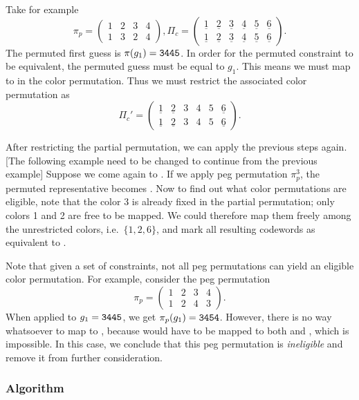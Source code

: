 Take for example 
\[
\pi_p = 
\begin{pmatrix}
1 & 2 & 3 & 4 \\
1 & 3 & 2 & 4
\end{pmatrix} , 
\Pi_c = 
\begin{pmatrix}
\underline{1} & \underline{2} & \underline{3} & \underline{4} & \underline{5} & \underline{6} \\
\underline{1} & \underline{2} & \underline{3} & \underline{4} & \underline{5} & \underline{6} 
\end{pmatrix} .
\] 
The permuted first guess is $\pi(g_1) = \texttt{3445}$. In order for the permuted constraint to be equivalent, the permuted guess must be equal to $g_1$. This means we must map  to  in the color permutation. Thus we must restrict the associated color permutation as
\[
\Pi_c' = 
\begin{pmatrix}
\underline{1} & \underline{2} & 3 & 4 & 5 & \underline{6} \\
\underline{1} & \underline{2} & 3 & 4 & 5  & \underline{6} 
\end{pmatrix} .
\]

After restricting the partial permutation, we can apply the previous steps again. 
[The following example need to be changed to continue from the previous example] Suppose we come again to . If we apply peg permutation $\pi_p^3$, the permuted representative becomes . Now to find out what color permutations are eligible, note that the color 3 is already fixed in the partial permutation; only colors 1 and 2 are free to be mapped. We could therefore map them freely among the unrestricted colors, i.e.\ $\{1, 2, 6\}$, and mark all resulting codewords as equivalent to .

Note that given a set of constraints, not all peg permutations can yield an eligible color permutation. For example, consider the peg permutation
\[
\pi_p = 
\begin{pmatrix}
1 & 2 & 3 & 4 \\
1 & 2 & 4 & 3
\end{pmatrix} .
\]
When applied to $g_1 = \texttt{3445}$, we get $\pi_p(g_1) = \texttt{3454}$. However, there is no way whatsoever to map  to , because  would have to be mapped to both  and , which is impossible. In this case, we conclude that this peg permutation is \emph{ineligible} and remove it from further consideration.

\subsubsection{Algorithm}

